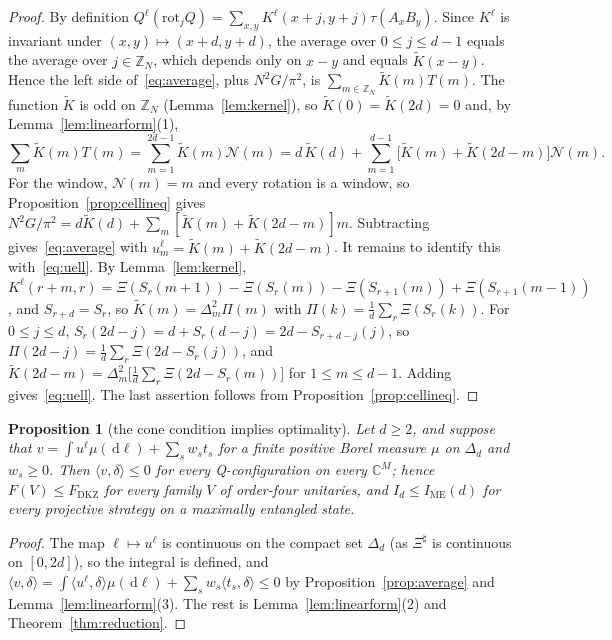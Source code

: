 \documentclass[11pt]{amsart}
\newtheorem{proposition}[theorem]{Proposition}
\theoremstyle{definition}
\theoremstyle{remark}
\numberwithin{equation}{section}
\newcommand{\Z}{\mathbb{Z}}
\newcommand{\C}{\mathbb{C}}
\newcommand{\FD}{F_{\mathrm{DKZ}}}
\newcommand{\IME}{I_{\mathrm{ME}}}
\newcommand{\ip}[2]{\langle #1,#2\rangle}
\newcommand{\cN}{\mathcal{N}}
\newcommand{\Sh}{\Xi^{\sharp}}
\newcommand{\dd}{\,\mathrm{d}}
\begin{document}
\begin{proof}
By definition $Q^\ell(\mathrm{rot}_jQ)=\sum_{x,y}K^\ell(x+j,y+j)\tau(A_xB_y)$. Since $K^\ell$ is invariant under
$(x,y)\mapsto(x+d,y+d)$, the average over $0\le j\le d-1$ equals the average over $j\in\Z_N$, which depends only on $x-y$
and equals $\tilde K(x-y)$. Hence the left side of~\eqref{eq:average}, plus $N^2G/\pi^2$, is
$\sum_{m\in\Z_N}\tilde K(m)T(m)$. The function $\tilde K$ is odd on $\Z_N$ (Lemma~\ref{lem:kernel}), so $\tilde K(0)=\tilde K(2d)=0$
and, by Lemma~\ref{lem:linearform}(1),
\[
\sum_m\tilde K(m)T(m)=\sum_{m=1}^{2d-1}\tilde K(m)\cN(m)=d\,\tilde K(d)+\sum_{m=1}^{d-1}\bigl[\tilde K(m)+\tilde K(2d-m)\bigr]\cN(m).
\]
For the window, $\cN(m)=m$ and every rotation is a window, so Proposition~\ref{prop:cellineq} gives
$N^2G/\pi^2=d\tilde K(d)+\sum_m[\tilde K(m)+\tilde K(2d-m)]m$. Subtracting gives~\eqref{eq:average} with
$u^\ell_m=\tilde K(m)+\tilde K(2d-m)$. It remains to identify this with~\eqref{eq:uell}. By Lemma~\ref{lem:kernel},
$K^\ell(r+m,r)=\Xi(S_r(m+1))-\Xi(S_r(m))-\Xi(S_{r+1}(m))+\Xi(S_{r+1}(m-1))$, and $S_{r+d}=S_r$, so
$\tilde K(m)=\Delta^2_m\Pi(m)$ with $\Pi(k)=\frac1d\sum_r\Xi(S_r(k))$. For $0\le j\le d$,
$S_r(2d-j)=d+S_r(d-j)=2d-S_{r+d-j}(j)$, so $\Pi(2d-j)=\frac1d\sum_r\Xi(2d-S_r(j))$, and
$\tilde K(2d-m)=\Delta^2_m\bigl[\frac1d\sum_r\Xi(2d-S_r(m))\bigr]$ for $1\le m\le d-1$. Adding gives~\eqref{eq:uell}. The
last assertion follows from Proposition~\ref{prop:cellineq}.
\end{proof}

\begin{proposition}[the cone condition implies optimality]\label{prop:conetoopt}
Let $d\ge2$, and suppose that $v=\int u^\ell\mu(\dd\ell)+\sum_sw_st_s$ for a finite positive Borel measure $\mu$ on $\Delta_d$
and $w_s\ge0$. Then $\ip v\delta\le0$ for every Q-configuration on every $\C^M$; hence $F(V)\le\FD$ for every family $V$ of
order-four unitaries, and $I_d\le\IME(d)$ for every projective strategy on a maximally entangled state.
\end{proposition}

\begin{proof}
The map $\ell\mapsto u^\ell$ is continuous on the compact set $\Delta_d$ (as $\Sh$ is continuous on $[0,2d]$), so the integral
is defined, and $\ip v\delta=\int\ip{u^\ell}\delta\mu(\dd\ell)+\sum_sw_s\ip{t_s}\delta\le0$ by
Proposition~\ref{prop:average} and Lemma~\ref{lem:linearform}(3). The rest is Lemma~\ref{lem:linearform}(2) and
Theorem~\ref{thm:reduction}.
\end{proof}
\end{document}
